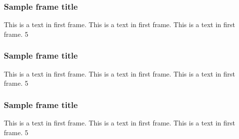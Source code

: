 \documentclass{beamer}
\begin{document}

\begin{frame}
\frametitle{Sample frame title}
This is a text in first frame. This is a text in first frame. This is a text in first frame.
\SI{5}{\nT}
\end{frame}


\begin{frame}
\frametitle{Sample frame title}
This is a text in first frame. This is a text in first frame. This is a text in first frame.
\SI{5}{\nT}
\end{frame}




\begin{frame}
\frametitle{Sample frame title}
This is a text in first frame. This is a text in first frame. This is a text in first frame.
\SI{5}{\nT}
\end{frame}






 
\end{document}
